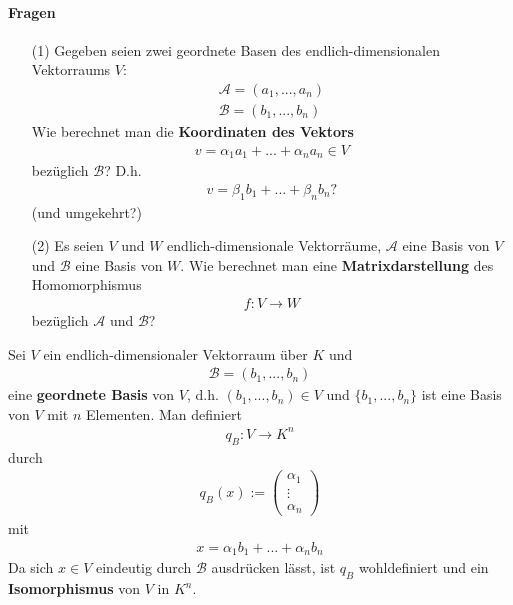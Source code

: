 \documentclass[11pt]{report}
\newcommand*\f[1] {\textbf{#1}}
\begin{document}
\paragraph{Fragen}
\begin{itemize}
 \item[(1)] Gegeben seien zwei geordnete Basen des endlich-dimensionalen Vektorraums $V$:
\begin{align}
\mathcal{A} = (a_1, ..., a_n) \\
\mathcal{B} = (b_1, ..., b_n) 
\end{align}
Wie berechnet man die \f{Koordinaten des Vektors}
\begin{align}
v = \alpha_1 a_1 + ... + \alpha_n a_n \in V
\end{align}
bezüglich $\mathcal{B}$? D.h.
\begin{align}
v = \beta_1 b_1 + ... + \beta_n b_n?
\end{align}
(und umgekehrt?)
 \item[(2)] Es seien $V$ und $W$ endlich-dimensionale Vektorräume, $\mathcal{A}$ eine Basis von $V$ und $\mathcal{B}$ eine Basis von $W$. Wie berechnet man eine \f{Matrixdarstellung} des Homomorphismus
\begin{align}
f: V \rightarrow W
\end{align}
bezüglich $\mathcal{A}$ und $\mathcal{B}$?
\end{itemize}
Sei $V$ ein endlich-dimensionaler Vektorraum über $K$ und
\begin{align}
\mathcal{B} = (b_1, ..., b_n)
\end{align}
eine \f{geordnete Basis} von $V$, d.h. $(b_1, ..., b_n) \in V$ und $\{b_1, ..., b_n\}$ ist eine Basis von $V$ mit $n$ Elementen. Man definiert
\begin{align}
q_B : V \rightarrow K^n
\end{align}
durch
\begin{align}
q_B(x) := \begin{pmatrix} \alpha_1 \\ \vdots \\ \alpha_n \end{pmatrix}
\end{align}
mit 
\begin{align}
x = \alpha_1 b_1 + ... + \alpha_n b_n
\end{align}
Da sich $x \in V$ eindeutig durch $\mathcal{B}$ ausdrücken lässt, ist $q_B$ wohldefiniert und ein \f{Isomorphismus} von $V$ in $K^n$.
\end{document}
